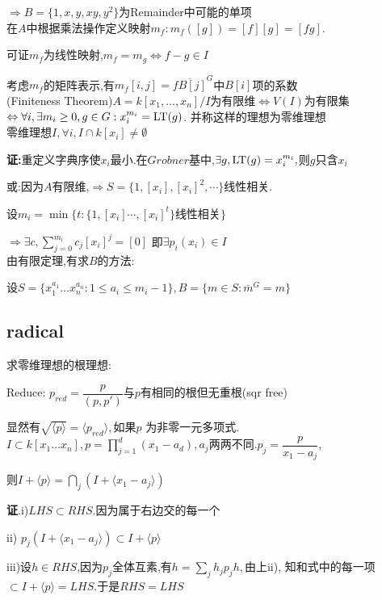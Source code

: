 $\Rightarrow B=\{ 1,x,y,xy,y^2\}$为Remainder中可能的单项
\\

在$ A$中根据乘法操作定义映射$ m_f:m_f([g])=[f][g]=[fg]$.

可证$ m_f$为线性映射,$ m_f=m_g\Leftrightarrow f-g\in I$

考虑$ m_f$的矩阵表示,有$ m_f[i,j]=\overline{f B[j]}^G$中$ B[i]$项的系数
\\

(Finiteness Theorem)$ A=k[x_1,\ldots,x_n]/I$为有限维$ \Leftrightarrow V(I)$为有限集
$ \Leftrightarrow \forall i,\exists m_i\ge0,g\in G:x_i^{m_i}=\operatorname{\tiny{LT}}(g)$.
并称这样的理想为零维理想
\\

零维理想$ I,\forall i,I\cap k[x_i]\neq \emptyset$

{\bf 证:}重定义字典序使$ x_i$最小.在$ Grobner$基中,$ \exists g,\operatorname{\tiny{LT}}(g)=x_i^{m_i},$则$ g$只含$ x_i$

或:因为$ A$有限维,$\Rightarrow  S=\{1,[x_i],[x_i]^2,\cdots\}$线性相关.

设$ m_i=\min\{t:\{ 1,[x_i]\cdots,[x_i]^{t} \}\texttt{线性相关}\}$

$ \Rightarrow \exists c,\sum_{j=0}^{m_i}{c_j[x_i]^j=[0]}$ 即$\exists p_i(x_i)\in I$
\\

由有限定理,有求$ B$的方法:

设$ S=\{ x_1^{a_1}\ldots x_n^{a_n}:1\le a_i\le m_i-1\},B=\{ m\in S:\overline{m}^G=m\}$

\subsection{radical}
求零维理想的根理想:

Reduce: $ p_{red}=\dfrac{p}{(p,p')}$与$ p$有相同的根但无重根(sqr free)

显然有$ \sqrt{\langle p \rangle}=\langle p_{red} \rangle,$如果$ p$ 为非零一元多项式.
\\

$ I\subset k[x_1\ldots x_n],p=\prod_{j=1}^{d}{( x_1-a_d )},a_j$两两不同.$ p_j=\dfrac{p}{x_1-a_j}$,

则$ I+\langle p \rangle = \bigcap\limits_{j}{(I+\langle x_1-a_j \rangle)}$

{\bf 证}.i)$ LHS \subset RHS$.因为属于右边交的每一个

ii) $ p_j(I+\langle x_1-a_j \rangle)\subset I+\langle p \rangle$

iii)设$ h \in RHS$,因为$ p_j$全体互素,有$ h=\sum_{j}{h_jp_jh},$由上ii),
知和式中的每一项$ \subset I+\langle p \rangle=LHS$.于是$ RHS=LHS$

